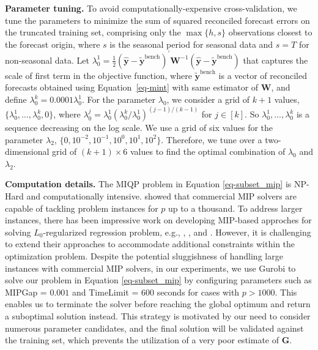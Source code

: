 \documentclass[
  12pt,
  11pt]{article}
\begin{document}
\textbf{Parameter tuning.} To avoid computationally-expensive
cross-validation, we tune the parameters to minimize the sum of squared
reconciled forecast errors on the truncated training set, comprising
only the \(\max\{h, s\}\) observations closest to the forecast origin,
where \(s\) is the seasonal period for seasonal data and \(s=T\) for
non-seasonal data. Let
\(\lambda_{0}^{1} = \frac{1}{2}\left(\hat{\bm{y}}-\tilde{\bm{y}}^{\text{bench}}\right)^{\prime} \bm{W}^{-1}\left(\hat{\bm{y}}-\tilde{\bm{y}}^{\text{bench}}\right)\)
that captures the scale of first term in the objective function, where
\(\tilde{\bm{y}}^{\text{bench}}\) is a vector of reconciled forecasts
obtained using Equation~\ref{eq-mint} with same estimator of \(\bm{W}\),
and define \(\lambda_{0}^{k} = 0.0001\lambda_{0}^{1}\). For the
parameter \(\lambda_0\), we consider a grid of \(k+1\) values,
\(\{\lambda_{0}^{1},...,\lambda_{0}^{k}, 0\}\), where
\(\lambda_{0}^{j} = \lambda_{0}^{1}\left(\lambda_{0}^{k} / \lambda_{0}^{1}\right)^{(j-1) / (k-1)}\)
for \(j \in [k]\). So \(\lambda_{0}^{1},...,\lambda_{0}^{k}\) is a
sequence decreasing on the log scale. We use a grid of six values for
the parameter \(\lambda_2\),
\(\{0, 10^{-2}, 10^{-1}, 10^{0}, 10^{1}, 10^{2}\}\). Therefore, we tune
over a two-dimensional grid of \((k+1) \times 6\) values to find the
optimal combination of \(\lambda_0\) and \(\lambda_2\).

\textbf{Computation details.} The MIQP problem in Equation
\ref{eq-subset_mip} is NP-Hard and computationally intensive.
\citet{Bertsimas2016-ig} showed that commercial MIP solvers are capable
of tackling problem instances for \(p\) up to a thousand. To address
larger instances, there has been impressive work on developing MIP-based
approches for solving \(L_0\)-regularized regression problem, e.g.,
\citet{Bertsimas2016-ig}, \citet{Hazimeh2020-xd}, and
\citet{Hazimeh2022-hc}. However, it is challenging to extend their
approaches to accommodate additional constraints within the optimization
problem. Despite the potential sluggishness of handling large instances
with commercial MIP solvers, in our experiments, we use Gurobi to solve
our problem in Equation \ref{eq-subset_mip} by configuring parameters
such as MIPGap = \(0.001\) and TimeLimit = \(600\) seconds for cases
with \(p > 1000\). This enables us to terminate the solver before
reaching the global optimum and return a suboptimal solution instead.
This strategy is motivated by our need to consider numerous parameter
candidates, and the final solution will be validated against the
training set, which prevents the utilization of a very poor estimate of
\(\bm{G}\).
\end{document}
